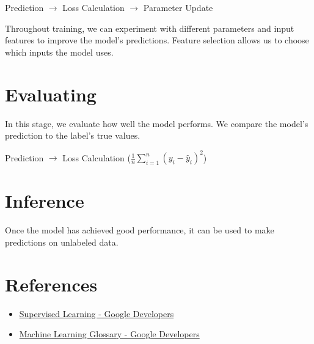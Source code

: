 \documentclass[a4paper,12pt]{article}
\begin{document}
\noindent Prediction $\rightarrow$ Loss Calculation $\rightarrow$ Parameter Update

\noindent Throughout training, we can experiment with different parameters and input features to improve the model's predictions. Feature selection allows us to choose which inputs the model uses.

\section{Evaluating}
In this stage, we evaluate how well the model performs. We compare the model's prediction to the label's true values. \newline

\noindent Prediction $\rightarrow$ Loss Calculation ($\frac{1}{n} \sum_{i=1}^{n} (y_i - \hat{y}_i)^2$)

\section{Inference}
Once the model has achieved good performance, it can be used to make predictions on unlabeled data.

\section{References}
\begin{itemize}
    \item \href{https://developers.google.com/machine-learning/intro-to-ml/supervised}{Supervised Learning - Google Developers}
    \item \href{https://developers.google.com/machine-learning/glossary}{Machine Learning Glossary - Google Developers}
\end{itemize}
\end{document}
